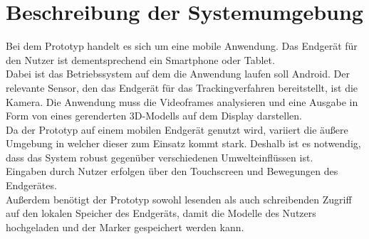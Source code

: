 \section{Beschreibung der Systemumgebung}
Bei dem Prototyp handelt es sich um eine mobile Anwendung. Das Endgerät für den Nutzer ist dementsprechend ein Smartphone oder Tablet. \\
Dabei ist das Betriebssystem auf dem die Anwendung laufen soll Android.
Der relevante Sensor, den das Endgerät für das Trackingverfahren bereitstellt, ist die Kamera. Die Anwendung muss die Videoframes analysieren und eine Ausgabe in Form von eines gerenderten 3D-Modells auf dem Display darstellen. \\
Da der Prototyp auf einem mobilen Endgerät genutzt wird, variiert die äußere Umgebung in welcher dieser zum Einsatz kommt stark. Deshalb ist es notwendig, dass das System robust gegenüber verschiedenen Umwelteinflüssen ist.\\
Eingaben durch Nutzer erfolgen über den Touchscreen und Bewegungen des Endgerätes. \\
Außerdem benötigt der Prototyp sowohl lesenden als auch schreibenden Zugriff auf den lokalen Speicher des Endgeräts, damit die Modelle des Nutzers hochgeladen und der Marker gespeichert werden kann. 


